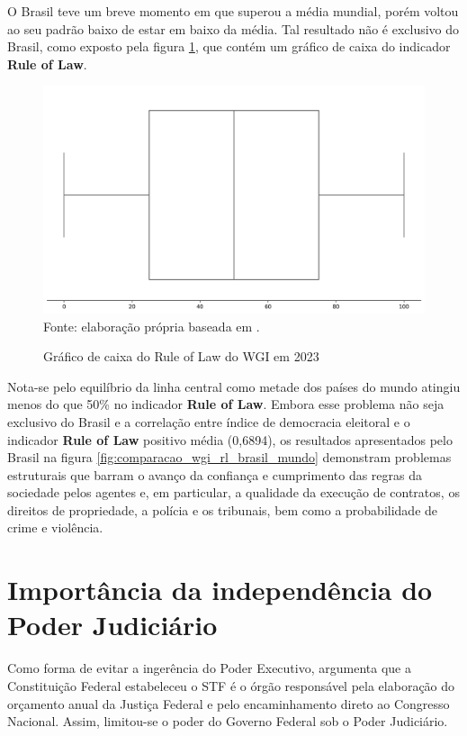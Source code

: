 O Brasil teve um breve momento em que superou a média mundial, porém voltou ao seu padrão baixo de estar em baixo da média. Tal resultado não é exclusivo do Brasil, como exposto pela figura \ref{fig:quartis_wgi_rl}, que contém um gráfico de caixa do indicador \textbf{Rule of Law}.

\begin{figure}[H]
	\centering
	\caption{Gráfico de caixa do Rule of Law do WGI em 2023}
	\includegraphics[width=1\linewidth]{figuras/quartis_wgi_rl}
	\label{fig:quartis_wgi_rl}
	\footnotesize{Fonte: elaboração própria baseada em \cite{wgi_dados}.}
\end{figure}

Nota-se pelo equilíbrio da linha central como metade dos países do mundo atingiu menos do que 50\% no indicador \textbf{Rule of Law}. Embora esse problema não seja exclusivo do Brasil e a correlação entre índice de democracia eleitoral e o indicador \textbf{Rule of Law} positivo média (0,6894), os resultados apresentados pelo Brasil na figura \ref{fig:comparacao_wgi_rl_brasil_mundo} demonstram problemas estruturais que barram o avanço da confiança e cumprimento das regras da sociedade pelos agentes e, em particular, a qualidade da execução de contratos, os direitos de propriedade, a polícia e os tribunais, bem como a probabilidade de crime e violência.

\section{Importância da independência do Poder Judiciário}

Como forma de evitar a ingerência do Poder Executivo, \cite{pires2021paradoxo} argumenta que a Constituição Federal estabeleceu o STF é o órgão responsável pela elaboração do orçamento anual da Justiça Federal e pelo encaminhamento direto ao Congresso Nacional. Assim, limitou-se o poder do Governo Federal sob o Poder Judiciário. 

